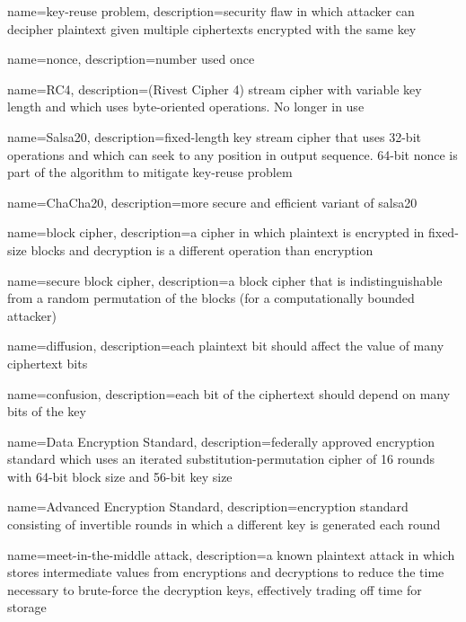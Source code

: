 {
    name={key-reuse problem},
    description={security flaw in which attacker can decipher plaintext given multiple ciphertexts encrypted with the same key}
}

{
    name={nonce},
    description={number used once}
}

{
    name={RC4},
    description={(Rivest Cipher 4) stream cipher with variable key length and which uses byte-oriented operations. No longer in use}
}

{
    name={Salsa20},
    description={fixed-length key stream cipher that uses 32-bit operations and which can seek to any position in output sequence. 64-bit \gls{nonce} is part of the algorithm to mitigate \gls{key-reuse problem}}
}

{
    name={ChaCha20},
    description={more secure and efficient variant of \gls{salsa20}}
}

{
    name={block cipher},
    description={a cipher in which plaintext is encrypted in fixed-size blocks and decryption is a different operation than encryption}
}

{
    name={secure block cipher},
    description={a block cipher that is indistinguishable from a random permutation of the blocks (for a computationally bounded attacker)}
}

{
    name={diffusion},
    description={each plaintext bit should affect the value of many ciphertext bits}
}

{
    name={confusion},
    description={each bit of the ciphertext should depend on many bits of the key}
}

{
    name={Data Encryption Standard},
    description={federally approved encryption standard which uses an iterated substitution\nobreakdash-permutation cipher of 16 rounds with 64-bit block size and 56-bit key size}
}

{
    name={Advanced Encryption Standard},
    description={encryption standard consisting of invertible rounds in which a different key is generated each round}
}

{
    name={meet-in-the-middle attack},
    description={a \gls{known plaintext attack} in which stores intermediate values from encryptions and decryptions to reduce the time necessary to brute-force the decryption keys, effectively trading off time for storage}
}

